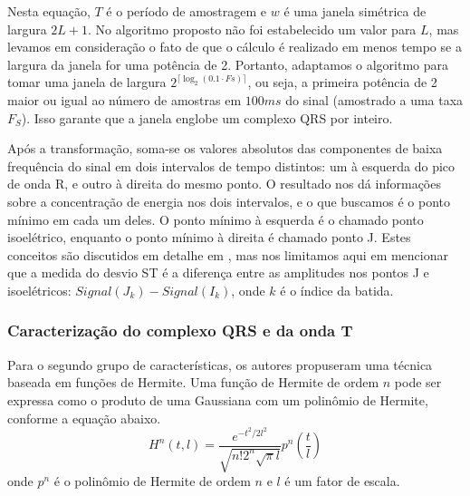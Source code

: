 Nesta equação, $T$ é o período de amostragem e $w$ é uma janela simétrica de largura $2L+1$. No algoritmo proposto não foi estabelecido um valor para $L$, mas levamos em consideração o fato de que o cálculo é realizado em menos tempo se a largura da janela for uma potência de 2. Portanto, adaptamos o algoritmo para tomar uma janela de largura $2^{\lceil\log_2(0.1\cdot Fs)\rceil}$, ou seja, a primeira potência de 2 maior ou igual ao número de amostras em $100ms$ do sinal (amostrado a uma taxa $F_S$). Isso garante que a janela englobe um complexo QRS por inteiro.

Após a transformação, soma-se os valores absolutos das componentes de baixa frequência do sinal em dois intervalos de tempo distintos: um à esquerda do pico de onda R, e outro à direita do mesmo ponto. O resultado nos dá informações sobre a concentração de energia nos dois intervalos, e o que buscamos é o ponto mínimo em cada um deles. O ponto mínimo à esquerda é o chamado ponto isoelétrico, enquanto o ponto mínimo à direita é chamado ponto J. Estes conceitos são discutidos em detalhe em \cite{Rocha10}, mas nos limitamos aqui em mencionar que a medida do desvio ST é a diferença entre as amplitudes nos pontos J e isoelétricos: $Signal(J_k) - Signal(I_k)$, onde $k$ é o índice da batida.

\subsubsection{Caracterização do complexo QRS e da onda T}
Para o segundo grupo de características, os autores propuseram uma técnica baseada em funções de Hermite. Uma função de Hermite de ordem $n$ pode ser expressa como o produto de uma Gaussiana com um polinômio de Hermite, conforme a equação abaixo.
\begin{equation} \label{equ:hermite_function}
    H^n(t,l) = \frac{e^{-t^2/2l^2}}{\sqrt{n!2^n\sqrt{\pi}l}}p^n\left(\frac{t}{l}\right)
\end{equation}
onde $p^n$ é o polinômio de Hermite de ordem $n$ e $l$ é um fator de escala.


